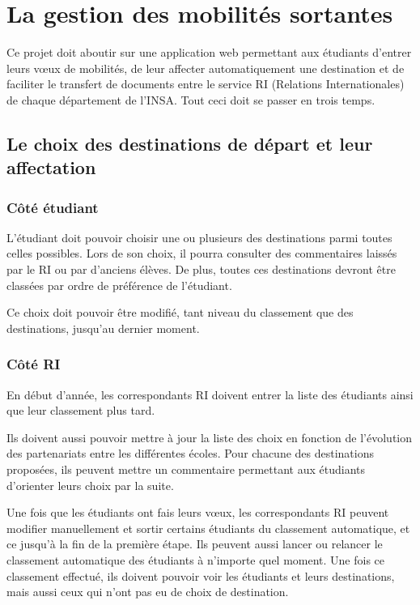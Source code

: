 
		\section{La gestion des mobilités sortantes}
		\label{sec::gestion_mobilite}
		
		Ce projet doit aboutir sur une application web permettant aux étudiants d'entrer leurs vœux de mobilités, de leur affecter automatiquement une destination et de faciliter le transfert de documents entre le service RI (Relations Internationales) de chaque département de l'INSA. Tout ceci doit se passer en trois temps.
		
		 \subsection{Le choix des destinations de départ et leur affectation}
		 
		 \subsubsection{Côté étudiant}
		 
		 L'étudiant doit pouvoir choisir une ou plusieurs des destinations parmi toutes celles possibles. Lors de son choix, il pourra consulter des commentaires laissés par le RI ou par d'anciens élèves. De plus, toutes ces destinations devront être classées par ordre de préférence de l'étudiant.
		 
		 Ce choix doit pouvoir être modifié, tant niveau du classement que des destinations, jusqu'au dernier moment.
		 
		\subsubsection{Côté RI}
		
		En début d'année, les correspondants RI doivent entrer la liste des étudiants ainsi que leur classement plus tard. 
		
		Ils doivent aussi pouvoir mettre à jour la liste des choix en fonction de l'évolution des partenariats entre les différentes écoles. Pour chacune des destinations proposées, ils peuvent mettre un commentaire permettant aux étudiants d'orienter leurs choix par la suite.
		
		Une fois que les étudiants ont fais leurs vœux, les correspondants RI peuvent modifier manuellement et sortir certains étudiants du classement automatique, et ce jusqu'à la fin de la première étape. Ils peuvent aussi lancer ou relancer le classement automatique des étudiants à n'importe quel moment. Une fois ce classement effectué, ils doivent pouvoir voir les étudiants et leurs destinations, mais aussi ceux qui n'ont pas eu de choix de destination.

